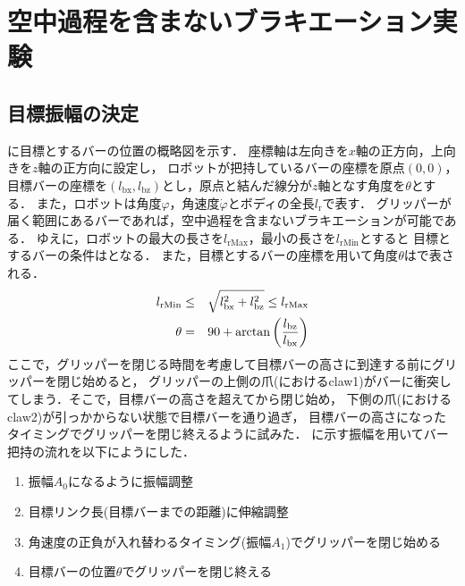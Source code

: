         \section{空中過程を含まないブラキエーション実験}

        \subsection{目標振幅の決定}
        に目標とするバーの位置の概略図を示す．
        座標軸は左向きを$x$軸の正方向，上向きを$z$軸の正方向に設定し，
        ロボットが把持しているバーの座標を原点$(0,0)$，
        目標バーの座標を$(l_{\mathrm{bx}},l_{\mathrm{bz}})$とし，原点と結んだ線分が$z$軸となす角度を$\theta$とする．
        また，ロボットは角度$\varphi$，角速度$\dot{\varphi}$とボディの全長$l_{\mathrm{r}}$で表す．
        グリッパーが届く範囲にあるバーであれば，空中過程を含まないブラキエーションが可能である．
        ゆえに，ロボットの最大の長さを$l_{\mathrm{rMax}}$，最小の長さを$l_{\mathrm{rMin}}$とすると
        目標とするバーの条件はとなる．
        また，目標とするバーの座標を用いて角度$\theta$はで表される．
        \begin{eqnarray}
                \equlabel{barRange}
                l_{\mathrm{rMin}} &\le& \sqrt{l_{\mathrm{bx}}^2+l_{\mathrm{bz}}^2} \le l_{\mathrm{rMax}}\\
                \equlabel{theta}
                \theta&=&90+\arctan{\left(\frac{l_{\mathrm{bz}}}{l_{\mathrm{bx}}}\right)}
                \end{eqnarray}  
        ここで，グリッパーを閉じる時間を考慮して目標バーの高さに到達する前にグリッパーを閉じ始めると，
        グリッパーの上側の爪(におけるclaw1)がバーに衝突してしまう．そこで，目標バーの高さを超えてから閉じ始め，
        下側の爪(におけるclaw2)が引っかからない状態で目標バーを通り過ぎ，
        目標バーの高さになったタイミングでグリッパーを閉じ終えるように試みた．
        に示す振幅を用いてバー把持の流れを以下にようにした．
        \begin{enumerate}
                \item 振幅$A_0$になるように振幅調整
                \item 目標リンク長(目標バーまでの距離)に伸縮調整
                \item 角速度の正負が入れ替わるタイミング(振幅$A_1$)でグリッパーを閉じ始める
                \item 目標バーの位置$\theta$でグリッパーを閉じ終える
        \end{enumerate}      
